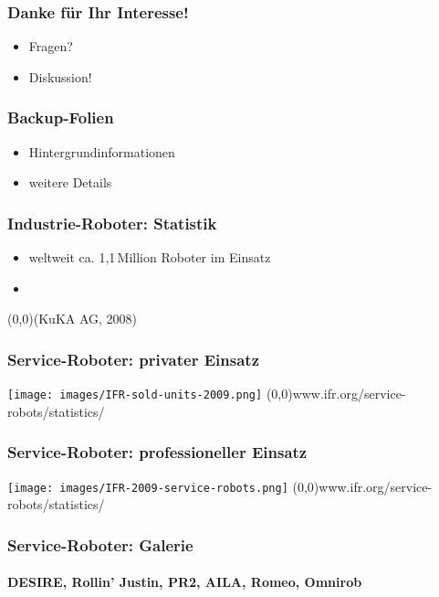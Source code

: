 \documentclass[t]{beamer}
\def\quelle#1{{\tiny \makebox(0,0){}\vfill\hfill #1}}
\def\ii{\item[]}
\begin{document}
\begin{frame}
\frametitle{Danke für Ihr Interesse!}
\begin{itemize}
\item Fragen?
\item Diskussion!
\end{itemize}
\end{frame}


\begin{frame}
\frametitle{Backup-Folien}
\begin{itemize}
\item Hintergrundinformationen
\item weitere Details
\end{itemize}
\end{frame}


\begin{frame}
\frametitle{Industrie-Roboter: Statistik}
%
%
\vspace*{-5mm}
\strut
\begin{itemize}
\item weltweit ca. 1,1\,Million Roboter im Einsatz
\ii
\end{itemize}
\vspace*{45mm}
\quelle{(KuKA AG, 2008)}
\end{frame}


\begin{frame}
\frametitle{Service-Roboter: privater Einsatz}
\texttt{[image: images/IFR-sold-units-2009.png]}
\quelle{www.ifr.org/service-robots/statistics/}
\end{frame}


\begin{frame}
\frametitle{Service-Roboter: professioneller Einsatz}
\texttt{[image: images/IFR-2009-service-robots.png]}
\quelle{www.ifr.org/service-robots/statistics/}
\end{frame}




\begin{frame}
\frametitle{Service-Roboter: Galerie}
\framesubtitle{DESIRE, Rollin' Justin, PR2, AILA, Romeo, Omnirob}
\end{frame}
\end{document}
